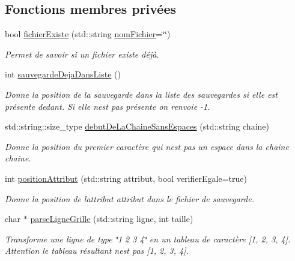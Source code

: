 \subsection*{Fonctions membres privées}
\begin{DoxyCompactItemize}
\item 
bool \hyperlink{class_gestion_sauvegarde_ae934513fc79f274e58214115c7a91112}{fichier\+Existe} (std\+::string \hyperlink{class_gestion_sauvegarde_afda944907acb4f5660cda5a893a8fb66}{nom\+Fichier}=\char`\"{}\char`\"{})
\begin{DoxyCompactList}\small\item\em Permet de savoir si un fichier existe déjà. \end{DoxyCompactList}\item 
int \hyperlink{class_gestion_sauvegarde_a82e99d080c8faa6eb7a4a485d0a8f9d3}{sauvegarde\+Deja\+Dans\+Liste} ()
\begin{DoxyCompactList}\small\item\em Donne la position de la sauvegarde dans la liste des sauvegardes si elle est présente dedant. Si elle n\textquotesingle{}est pas présente on renvoie -\/1. \end{DoxyCompactList}\item 
std\+::string\+::size\+\_\+type \hyperlink{class_gestion_sauvegarde_a9f8c29aaf4fdbe9551d03b6aaa0b8e17}{debut\+De\+La\+Chaine\+Sans\+Espaces} (std\+::string chaine)
\begin{DoxyCompactList}\small\item\em Donne la position du premier caractère qui n\textquotesingle{}est pas un espace dans la chaine {\ttfamily chaine}. \end{DoxyCompactList}\item 
int \hyperlink{class_gestion_sauvegarde_a0ad9febb973f56faddba093a2237fbe2}{position\+Attribut} (std\+::string attribut, bool verifier\+Egale=true)
\begin{DoxyCompactList}\small\item\em Donne la position de l\textquotesingle{}attribut {\ttfamily attribut} dans le fichier de sauvegarde. \end{DoxyCompactList}\item 
char $\ast$ \hyperlink{class_gestion_sauvegarde_a42d4903a86cad6b83006028cf399cdba}{parse\+Ligne\+Grille} (std\+::string ligne, int taille)
\begin{DoxyCompactList}\small\item\em Transforme une ligne de type \char`\"{}1 2 3 4\char`\"{} en un tableau de caractère \mbox{[}1, 2, 3, 4\mbox{]}. Attention le tableau résultant n\textquotesingle{}est pas \mbox{[}\textquotesingle{}1\textquotesingle{}, \textquotesingle{}2\textquotesingle{}, \textquotesingle{}3\textquotesingle{}, \textquotesingle{}4\textquotesingle{}\mbox{]}. \end{DoxyCompactList}\item 

\end{DoxyCompactItemize}
